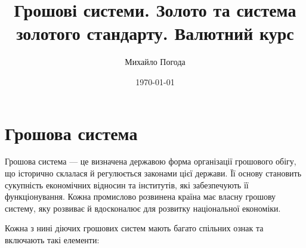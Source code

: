 \documentclass[a4paper,12pt,notitlepage,pdftex,headsepline]{scrartcl}
\author{Михайло Погода}
\title{Грошові системи. Золото та система золотого стандарту. Валютний курс}
\date{\today}
\begin{document}
\maketitle
\section{Грошова система}

  Грошова система --- це визначена державою форма організації грошового обігу, що історично
  склалася й регулюється законами цієї держави.
  Її основу становить сукупність економічних відносин та інститутів, які забезпечують її
  функціонування.
  Кожна промислово розвинена країна має власну грошову систему, яку розвиває й вдосконалює
  для розвитку національної економіки.

  Кожна з нині діючих грошових систем мають багато спільних ознак та включають такі елементи:
\end{document}
